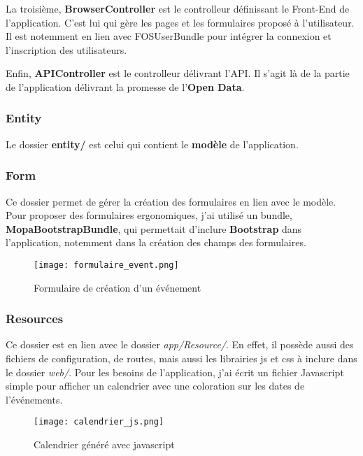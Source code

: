 La troisième, \textbf{BrowserController} est le controlleur définissant le Front-End de l'application. C'est lui qui gère les pages et les formulaires proposé à l'utilisateur. Il est notemment en lien avec FOSUserBundle pour intégrer la connexion et l'inscription des utilisateurs.

Enfin, \textbf{APIController} est le controlleur délivrant l'API. Il s'agit là de la partie de l'application délivrant la promesse de l'\textbf{Open Data}.

\subsubsection*{Entity}

Le dossier \textbf{entity/} est celui qui contient le \textbf{modèle} de l'application.


\subsubsection*{Form}

Ce dossier permet de gérer la création des formulaires en lien avec le modèle. Pour proposer des formulaires ergonomiques, j'ai utilisé un bundle, \textbf{MopaBootstrapBundle}, qui permettait d'inclure \textbf{Bootstrap} dans l'application, notemment dans la création des champs des formulaires.

\begin{figure}[h]
\begin{center}
\texttt{[image: formulaire\_event.png]}
\end{center}
\caption{Formulaire de création d'un événement}
\end{figure}

\newpage

\subsubsection*{Resources}

Ce dossier est en lien avec le dossier \textit{app/Resource/}. En effet, il possède aussi des fichiers de configuration, de routes, mais aussi les librairies js et css à inclure dans le dossier \textit{web/}. Pour les besoins de l'application, j'ai écrit un fichier Javascript simple pour afficher un calendrier avec une coloration sur les dates de l'événements.

\begin{figure}[h]
\begin{center}
\texttt{[image: calendrier\_js.png]}
\end{center}
\caption{Calendrier généré avec javascript}
\end{figure}

